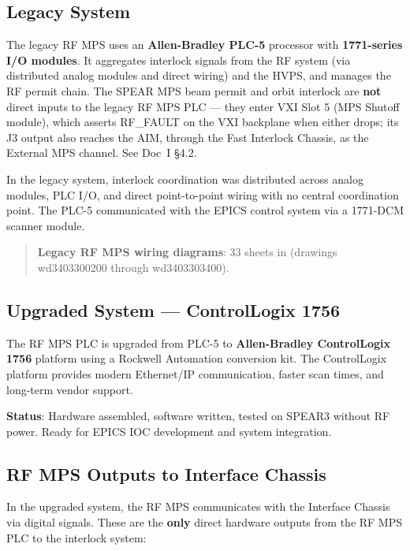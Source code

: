 \subsection{Legacy System}\label{legacy-system-1}

The legacy RF MPS uses an \textbf{Allen-Bradley PLC-5} processor with \textbf{1771-series I/O modules}. It aggregates interlock signals from the RF system (via distributed analog modules and direct wiring) and the HVPS, and manages the RF permit chain. The SPEAR MPS beam permit and orbit interlock are \textbf{not} direct inputs to the legacy RF MPS PLC --- they enter VXI Slot 5 (MPS Shutoff module), which asserts RF\_FAULT on the VXI backplane when either drops; its J3 output also reaches the AIM, through the Fast Interlock Chassis, as the External MPS channel. See Doc~I §4.2.

In the legacy system, interlock coordination was distributed across analog modules, PLC I/O, and direct point-to-point wiring with no central coordination point. The PLC-5 communicated with the EPICS control system via a 1771-DCM scanner module.

\begin{quote}
\textbf{Legacy RF MPS wiring diagrams}: 33 sheets in  (drawings wd3403300200 through wd3403303400).
\end{quote}

\subsection{Upgraded System --- ControlLogix 1756}\label{upgraded-system-controllogix-1756}

The RF MPS PLC is upgraded from PLC-5 to \textbf{Allen-Bradley ControlLogix 1756} platform using a Rockwell Automation conversion kit. The ControlLogix platform provides modern Ethernet/IP communication, faster scan times, and long-term vendor support.

\textbf{Status}: Hardware assembled, software written, tested on SPEAR3 without RF power. Ready for EPICS IOC development and system integration.

\subsection{RF MPS Outputs to Interface Chassis}\label{rf-mps-outputs-to-interface-chassis}

In the upgraded system, the RF MPS communicates with the Interface Chassis via digital signals. These are the \textbf{only} direct hardware outputs from the RF MPS PLC to the interlock system:

